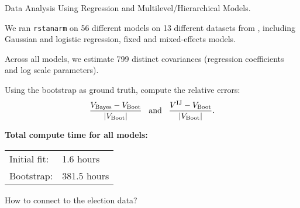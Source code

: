\begin{frame}{Data Analysis Using Regression and Multilevel/Hierarchical Models.}

    \begin{minipage}{0.49\textwidth}
    
    We ran \texttt{rstanarm} on 56 different models on 13 different datasets
    from \citet{gelman:2006:arm},
    including Gaussian and logistic regression, fixed and mixed-effects models.
    
    \spskip Across all models, we estimate 799 distinct covariances (regression
    coefficients and log scale parameters).
    
    \spskip
    Using the bootstrap as ground truth, compute the relative errors:
    \begin{align*}
    \frac{V_{\mathrm{Bayes}} - V_{\mathrm{Boot}}}{|V_{\mathrm{Boot}}|}
    \,\,\,
    \textrm{ and }
    \,\,\,
    \frac{V^{\mathrm{IJ}} - V_{\mathrm{Boot}}}{|V_{\mathrm{Boot}}|}.
    \end{align*}
    \end{minipage}
    \begin{minipage}{0.49\textwidth}
        \ARMRelFig{}
        \textbf{Total compute time for all models:}
    
        \begin{tabular}{ll}
        Initial fit: & 1.6 hours \\
        Bootstrap: & 381.5 hours\\
        \end{tabular}
\end{minipage}

\end{frame}



\begin{frame}[c]{How to connect to the election data?}

\begin{minipage}{0.48\textwidth}
    \ElectionData{}
\end{minipage}
\begin{minipage}{0.48\textwidth}
    \ElectionResultsGlobal{}
\end{minipage}


\end{frame}